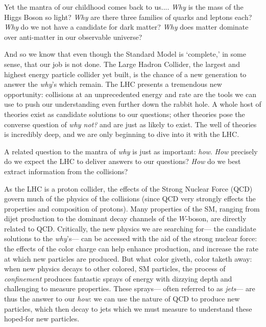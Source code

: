 Yet the mantra of our childhood comes back to us.... \textit{Why} is the mass of the Higgs Boson so light? \textit{Why} are there three families of quarks and leptons each? \textit{Why} do we not have a candidate for dark matter? \textit{Why} does matter dominate over anti-matter in our observable universe?

And so we know that even though the Standard Model is `complete,' in some sense, that our job is not done. The Large Hadron Collider, the largest and highest energy particle collider yet built, is the chance of a new generation to answer the \textit{why}'s which remain. The LHC presents a tremendous new opportunity: collisions at an unprecedented energy and rate are the tools we can use to push our understanding even further down the rabbit hole. A whole host of theories exist as candidate solutions to our questions; other theories pose the converse question of \textit{why not?} and are just as likely to exist. The well of theories is incredibly deep, and we are only beginning to dive into it with the LHC.

A related question to the mantra of \textit{why} is just as important: \textit{how}. \textit{How} precisely do we expect the LHC to deliver answers to our questions? \textit{How} do we best extract information from the collisions?

As the LHC is a proton collider, the effects of the Strong Nuclear Force (QCD) govern much of the physics of the collisions (since QCD very strongly effects the properties and composition of protons). Many properties of the SM, ranging from dijet production to the dominant decay channels of the $W$-boson, are directly related to QCD. Critically, the new physics we are searching for--- the candidate solutions to the \textit{why}'s--- can be accessed with the aid of the strong nuclear force: the effects of the color charge can help enhance production, and increase the rate at which new particles are produced. But what color giveth, color taketh away: when new physics decays to other colored, SM particles, the process of \textit{confinement} produces fantastic sprays of energy with dizzying depth and challenging to measure properties. These sprays--- often referred to as \textit{jets}--- are thus the answer to our \textit{how}: we can use the nature of QCD to produce new particles, which then decay to jets which we must measure to understand these hoped-for new particles.

